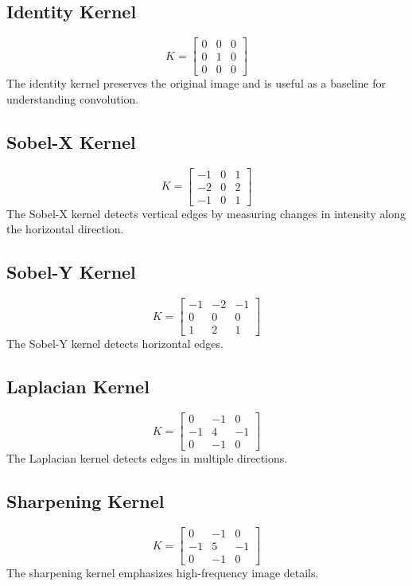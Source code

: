 \documentclass[11pt]{article}
\begin{document}
\subsection{Identity Kernel}
\[
K = \begin{bmatrix} 0 & 0 & 0 \\ 0 & 1 & 0 \\ 0 & 0 & 0 \end{bmatrix}
\]
The identity kernel preserves the original image and is useful as a baseline for understanding convolution.

\subsection{Sobel-X Kernel}
\[
K = \begin{bmatrix} -1 & 0 & 1 \\ -2 & 0 & 2 \\ -1 & 0 & 1 \end{bmatrix}
\]
The Sobel-X kernel detects vertical edges by measuring changes in intensity along the horizontal direction.

\subsection{Sobel-Y Kernel}
\[
K = \begin{bmatrix} -1 & -2 & -1 \\ 0 & 0 & 0 \\ 1 & 2 & 1 \end{bmatrix}
\]
The Sobel-Y kernel detects horizontal edges.

\subsection{Laplacian Kernel}
\[
K = \begin{bmatrix} 0 & -1 & 0 \\ -1 & 4 & -1 \\ 0 & -1 & 0 \end{bmatrix}
\]
The Laplacian kernel detects edges in multiple directions.

\subsection{Sharpening Kernel}
\[
K = \begin{bmatrix} 0 & -1 & 0 \\ -1 & 5 & -1 \\ 0 & -1 & 0 \end{bmatrix}
\]
The sharpening kernel emphasizes high-frequency image details.
\end{document}
